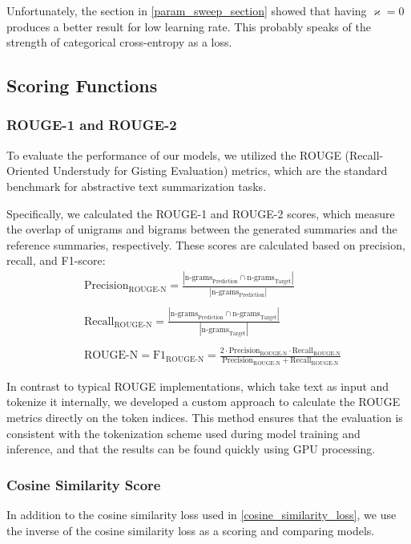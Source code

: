 Unfortunately, the section in \cref{param_sweep_section} showed that having $\varkappa = 0$ produces a better result for low learning rate.
This probably speaks of the strength of categorical cross-entropy as a loss.

\subsection{Scoring Functions}
\label{scoring_section}
\subsubsection{ROUGE-1 and ROUGE-2}
To evaluate the performance of our models, we utilized the ROUGE (Recall-Oriented Understudy for Gisting Evaluation) metrics, which are the standard benchmark for abstractive text summarization tasks\cite{abstCNN}.

Specifically, we calculated the ROUGE-1 and ROUGE-2 scores, which measure the overlap of unigrams and bigrams between the generated summaries and the reference summaries, respectively. These scores are calculated based on precision, recall, and F1-score:
\begin{equation}
    \begin{split}
        &\text{Precision}_{\text{ROUGE-N}} = \frac{|\text{n-grams}_{\text{Prediction}} \cap \text{n-grams}_{\text{Target}}|}{|\text{n-grams}_{\text{Prediction}}|}
        \\\\
        &\text{Recall}_{\text{ROUGE-N}} = \frac{|\text{n-grams}_{\text{Prediction}} \cap \text{n-grams}_{\text{Target}}|}{|\text{n-grams}_{\text{Target}}|}
        \\\\
        &\text{ROUGE-N} = \text{F1}_{\text{ROUGE-N}} = \frac{2 \cdot \text{Precision}_{\text{ROUGE-N}} \cdot \text{Recall}_{\text{ROUGE-N}}}{\text{Precision}_{\text{ROUGE-N}} + \text{Recall}_{\text{ROUGE-N}}}
    \end{split}
\end{equation}

In contrast to typical ROUGE implementations, which take text as input and tokenize it internally, we developed a custom approach to calculate the ROUGE metrics directly on the token indices.
This method ensures that the evaluation is consistent with the tokenization scheme used during model training and inference, and that the results can be found quickly using GPU processing.

\subsubsection{Cosine Similarity Score}
In addition to the cosine similarity loss used in \cref{cosine_similarity_loss}, we use the inverse of the cosine similarity loss as a scoring and comparing models.

